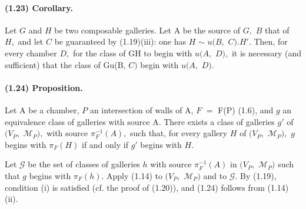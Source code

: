 \documentclass[10pt,a4paper]{article}
\begin{document}
\paragraph{(1.23) Corollary.} Let \ensuremath{G} and \ensuremath{H} be two composable galleries. Let A be the source of \ensuremath{G,} \ensuremath{B} that of \ensuremath{H,} and let \ensuremath{C} be guaranteed by (1.19)(iii): one has \ensuremath{H} \ensuremath{\sim{}} \ensuremath{u(B,} \ensuremath{C).H'.} Then, for every chamber \ensuremath{D,} for the class of GH to begin with \ensuremath{u(A,} \ensuremath{D),} it is necessary (and sufficient) that the class of Gu(B, \ensuremath{C)} begin with \ensuremath{u(A,} \ensuremath{D).}


\paragraph{(1.24) Proposition.} Let A be a chamber, \ensuremath{P} an intersection of walls of A, \ensuremath{F} \ensuremath{=} F(P) (1.6), and \ensuremath{g} an equivalence class of galleries with source A. There exists a class of galleries \ensuremath{g'} of \ensuremath{(V_P,} \ensuremath{\mathcal{M}_P),} with source \ensuremath{\pi{}_F^{-1}(A),} such that, for every gallery \ensuremath{H} of \ensuremath{(V_P,} \ensuremath{\mathcal{M}_P),} \ensuremath{g} begins with \ensuremath{\pi{}_F(H)} if and only if \ensuremath{g'} begins with \ensuremath{H.}

Let \ensuremath{\mathcal{G}} be the set of classes of galleries \ensuremath{h} with source \ensuremath{\pi{}_F^{-1}(A)} in \ensuremath{(V_P,} \ensuremath{\mathcal{M}_P)} such that \ensuremath{g} begins with \ensuremath{\pi{}_F(h).} Apply (1.14) to \ensuremath{(V_P,} \ensuremath{\mathcal{M}_P)} and to \ensuremath{\mathcal{G}.} By (1.19), condition (i) is satisfied (cf. the proof of (1.20)), and (1.24) follows from (1.14)(ii).\par
\end{document}
